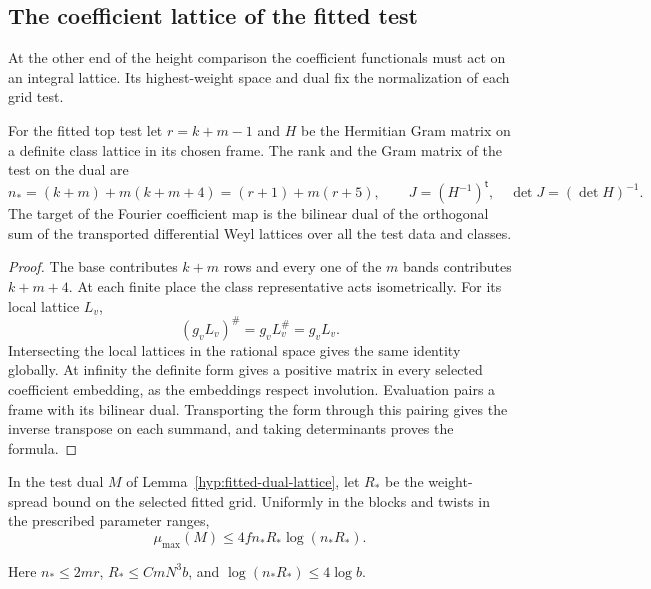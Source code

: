 \subsection{The coefficient lattice of the fitted test}
\label{subsec:fitted-test-slope}

At the other end of the height comparison the coefficient functionals must act on an integral lattice. Its highest-weight space and dual fix the normalization of each grid test.

\begin{established}\label{hyp:fitted-dual-lattice}
For the fitted top test let \(r=k+m-1\) and \(H\) be the Hermitian
Gram matrix on a definite class lattice in its chosen frame.
The rank and the Gram matrix of the test on the dual are
\[
 n_*=(k+m)+m(k+m+4)=(r+1)+m(r+5),\qquad
 J=(H^{-1})^{\mathsf t},\quad \det J=(\det H)^{-1}.
\]
The target of the Fourier coefficient map is the bilinear dual of
the orthogonal sum of the transported differential Weyl lattices over
all the test data and classes.
\end{established}
\begin{proof}
The base contributes \(k+m\) rows and every one of the \(m\) bands
contributes \(k+m+4\). At each finite place the class representative
acts isometrically. For its local lattice \(L_v\),
\[
              (g_v L_v)^\#=g_v L_v^\#=g_v L_v .
\]
Intersecting the local lattices in the rational space gives the same
identity globally. At infinity the definite form gives a positive
matrix in every selected coefficient embedding, as the embeddings
respect involution. Evaluation pairs a frame with its bilinear dual.
Transporting the form through this pairing gives the inverse
transpose on each summand, and taking determinants proves the formula.
\end{proof}

\begin{proposition}\label{prop:fitted-coefficient-slope}
In the test dual \(M\) of Lemma~\ref{hyp:fitted-dual-lattice}, let \(R_*\) be the
weight-spread bound on the selected fitted grid. Uniformly in the blocks and twists in the prescribed parameter ranges,
\[
 \mu_{\max}(M)\le4fn_*R_*\log(n_*R_*).
\]

Here \(n_*\le2mr\), \(R_*\le CmN^3b\), and
\(\log(n_*R_*)\le4\log b\).
\end{proposition}

